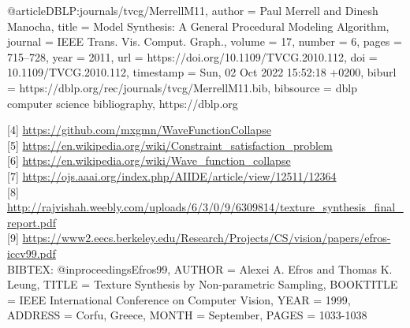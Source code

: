 \documentclass[12pt, a4paper,twoside,openright]{report}
\begin{document}
@article{DBLP:journals/tvcg/MerrellM11,
  author       = {Paul Merrell and
                  Dinesh Manocha},
  title        = {Model Synthesis: {A} General Procedural Modeling Algorithm},
  journal      = {{IEEE} Trans. Vis. Comput. Graph.},
  volume       = {17},
  number       = {6},
  pages        = {715--728},
  year         = {2011},
  url          = {https://doi.org/10.1109/TVCG.2010.112},
  doi          = {10.1109/TVCG.2010.112},
  timestamp    = {Sun, 02 Oct 2022 15:52:18 +0200},
  biburl       = {https://dblp.org/rec/journals/tvcg/MerrellM11.bib},
  bibsource    = {dblp computer science bibliography, https://dblp.org}
}

{[4]} \url{https://github.com/mxgmn/WaveFunctionCollapse}\\
{[5]} \url{https://en.wikipedia.org/wiki/Constraint_satisfaction_problem}\\
{[6]} \url{https://en.wikipedia.org/wiki/Wave_function_collapse}\\
{[7]} \url{https://ojs.aaai.org/index.php/AIIDE/article/view/12511/12364}\\
{[8]} \url{http://rajvishah.weebly.com/uploads/6/3/0/9/6309814/texture_synthesis_final_report.pdf}\\
{[9]} \url{https://www2.eecs.berkeley.edu/Research/Projects/CS/vision/papers/efros-iccv99.pdf}\\

BIBTEX:
@inproceedings{Efros99,
    AUTHOR  = {Alexei A. Efros and Thomas K. Leung},
    TITLE   = {Texture Synthesis by Non-parametric Sampling},
    BOOKTITLE = {IEEE International Conference on Computer Vision},
    YEAR    = {1999},
    ADDRESS = {Corfu, Greece},
    MONTH   = {September},
    PAGES   = {1033-1038}
}
\end{document}
